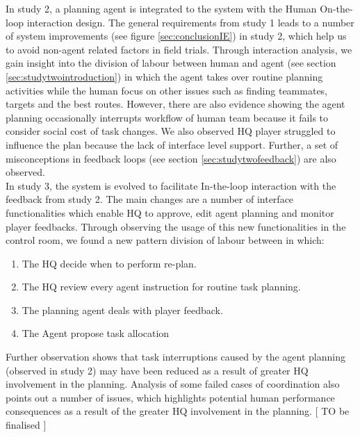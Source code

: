 In study 2, a planning agent is integrated to the system with the Human On-the-loop interaction design. The general requirements from study 1 leads to a number of system improvements (see figure \ref{sec:conclusionIE}) in study 2, which help us to avoid non-agent related factors in field trials. Through interaction analysis, we gain insight into the division of labour between human and agent (see section \ref{sec:studytwointroduction}) in which the agent takes over routine planning activities while the human focus on other issues such as finding teammates, targets and the best routes. However, there are also evidence showing the agent planning occasionally interrupts workflow of human team because it fails to consider social cost of task changes. We also observed HQ player struggled to influence the plan because the lack of interface level support. Further, a set of misconceptions in feedback loops (see section \ref{sec:studytwofeedback}) are also observed.\\

In study 3, the system is evolved to facilitate In-the-loop interaction with the feedback from study 2. The main changes are a number of interface functionalities which enable HQ to approve, edit agent planning and monitor player feedbacks. Through observing the usage of this new functionalities in the control room, we found a new pattern division of labour between in which:
	\begin{enumerate}
	 \item The HQ decide when to perform re-plan.
	 \item The HQ review every agent instruction for routine task planning.
	 \item The planning agent deals with player feedback.
	 \item The Agent propose task allocation
	\end{enumerate}
	
Further observation shows that task interruptions caused by the agent planning (observed in study 2) may have been reduced as a result of greater HQ involvement in the planning. Analysis of some failed cases of coordination also points out a number of issues, which highlights potential human performance consequences as a result of the greater HQ involvement in the planning. [ TO be finalised ]  \\

